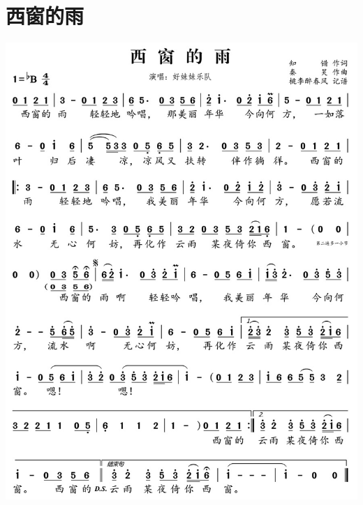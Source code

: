 \documentclass[cn,pad,twocol]{elegantbook}
\begin{document}
\section{西窗的雨}  \includegraphics[width=\textwidth]{dongxiao/20200516-好妹妹-西窗的雨.jpg} 
\end{document}
